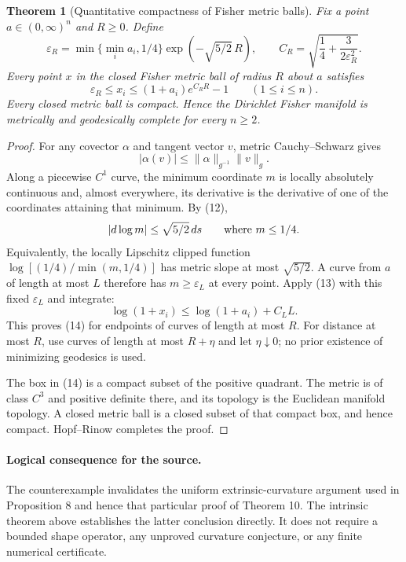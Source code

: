 \documentclass[11pt,a4paper]{article}
\newtheorem{theorem}{Theorem}
\begin{document}
\begin{theorem}[Quantitative compactness of Fisher metric balls]
Fix a point $a\in(0,\infty)^n$ and $R\ge0$. Define
\[
 \varepsilon_R=\min\{\min_i a_i,1/4\}
                   \exp\!\left(-\sqrt{5/2}\,R\right),
 \qquad
 C_R=\sqrt{\frac14+\frac3{2\varepsilon_R^2}}.
\]
Every point $x$ in the closed Fisher metric ball of radius $R$ about $a$
satisfies
\[
 \varepsilon_R\le x_i\le(1+a_i)e^{C_RR}-1
 \qquad(1\le i\le n).
\tag{14}
\]
Every closed metric ball is compact. Hence the Dirichlet Fisher manifold
is metrically and geodesically complete for every $n\ge2$.
\end{theorem}
\begin{proof}
For any covector $\alpha$ and tangent vector $v$, metric Cauchy--Schwarz
gives
\[
 |\alpha(v)|\le\|\alpha\|_{g^{-1}}\|v\|_g.
\]
Along a piecewise $C^1$ curve, the minimum coordinate $m$ is locally
absolutely continuous and, almost everywhere, its derivative is the
derivative of one of the coordinates attaining that minimum. By (12),
\[
 |d\log m|\le\sqrt{5/2}\,ds\qquad\hbox{where }m\le1/4.
\]
Equivalently, the locally Lipschitz clipped function
$\log[(1/4)/\min(m,1/4)]$ has metric slope at most $\sqrt{5/2}$.
A curve from $a$ of length at most $L$ therefore has $m\ge\varepsilon_L$
at every point. Apply (13) with this fixed $\varepsilon_L$ and integrate:
\[
 \log(1+x_i)\le\log(1+a_i)+C_LL.
\]
This proves (14) for endpoints of curves of length at most $R$.
For distance at most $R$, use curves of length at most $R+\eta$ and let
$\eta\downarrow0$; no prior existence of minimizing geodesics is used.

The box in (14) is a compact subset of the positive quadrant.
The metric is of class $C^3$ and positive definite there, and its topology is
the Euclidean manifold topology. A closed metric ball is a closed subset
of that compact box, and hence compact. Hopf--Rinow completes the proof.
\end{proof}

\paragraph{Logical consequence for the source.}
The counterexample invalidates the uniform extrinsic-curvature argument
used in Proposition 8 and hence that particular proof of Theorem 10.
The intrinsic theorem above establishes the latter conclusion directly.
It does not require a bounded shape operator, any unproved curvature
conjecture, or any finite numerical certificate.
\end{document}
